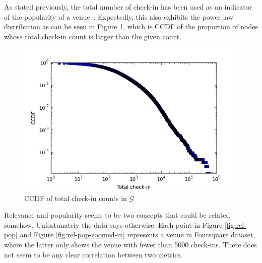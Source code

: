 As stated previously, the total number of check-in has been used as an indicator of the popularity of a venue~\citep{noulas2011empirical}. Expectedly, this also exhibits the power law distribution as can be seen in Figure \ref{fig:checkin-distribution}, which is CCDF of the proportion of nodes whose total check-in count is larger than the given count.
\begin{figure}
\centering
\includegraphics[scale=0.5]{../checkin_new_ccdf.png}
\caption{CCDF of total check-in counts in $\mathcal{G}$}
\label{fig:checkin-distribution}
\end{figure}

Relevance and popularity seems to be two concepts that could be related somehow. Unfortunately the data says otherwise. Each point in Figure \ref{fig:rel-pop} and Figure \ref{fig:rel-pop-zoomed-in} represents a venue in Foursquare dataset, where the latter only shows the venue with fewer than 5000 check-ins. There does not seem to be any clear correlation between two metrics.

